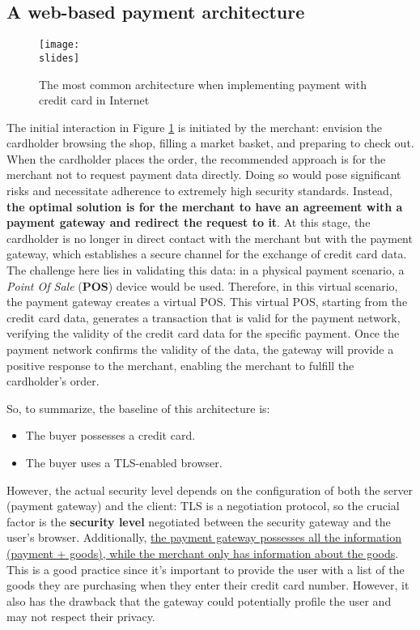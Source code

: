 \subsection{A web-based payment architecture}

\begin{figure}[h]
    \centering
    \texttt{[image: \\slides]}
    \caption{The most common architecture when implementing payment with credit card in Internet}
    \label{fig:web-based-payment}
\end{figure}

The initial interaction in Figure \ref*{fig:web-based-payment} is initiated by the merchant: envision the cardholder browsing the shop, filling a market basket, and preparing to check out. When the cardholder places the order, the recommended approach is for the merchant not to request payment data directly. Doing so would pose significant risks and necessitate adherence to extremely high security standards. Instead, \textbf{the optimal solution is for the merchant to have an agreement with a payment gateway and redirect the request to it}. At this stage, the cardholder is no longer in direct contact with the merchant but with the payment gateway, which establishes a secure channel for the exchange of credit card data. The challenge here lies in validating this data: in a physical payment scenario, a \textit{Point Of Sale} (\textbf{POS}) device would be used. Therefore, in this virtual scenario, the payment gateway creates a virtual POS. This virtual POS, starting from the credit card data, generates a transaction that is valid for the payment network, verifying the validity of the credit card data for the specific payment. Once the payment network confirms the validity of the data, the gateway will provide a positive response to the merchant, enabling the merchant to fulfill the cardholder's order.

So, to summarize, the baseline of this architecture is:
\begin{itemize}
    \item The buyer possesses a credit card.
    \item The buyer uses a TLS-enabled browser.
\end{itemize}

However, the actual security level depends on the configuration of both the server (payment gateway) and the client: TLS is a negotiation protocol, so the crucial factor is the \textbf{security level} negotiated between the security gateway and the user's browser. Additionally, \ul{the payment gateway possesses all the information (payment + goods), while the merchant only has information about the goods}. This is a good practice since it's important to provide the user with a list of the goods they are purchasing when they enter their credit card number. However, it also has the drawback that the gateway could potentially profile the user and may not respect their privacy.


